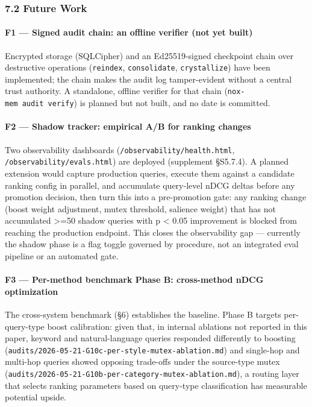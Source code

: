 \documentclass[
]{article}
\begin{document}
\subsubsection{7.2 Future Work}\label{future-work}

\paragraph{F1 --- Signed audit chain: an offline verifier (not yet
built)}\label{f1-signed-audit-chain-an-offline-verifier-not-yet-built}

Encrypted storage (SQLCipher) and an Ed25519-signed checkpoint chain
over destructive operations (\texttt{reindex}, \texttt{consolidate},
\texttt{crystallize}) have been implemented; the chain makes the audit
log tamper-evident without a central trust authority. A standalone,
offline verifier for that chain (\texttt{nox-mem\ audit\ verify}) is
planned but not built, and no date is committed.

\paragraph{F2 --- Shadow tracker: empirical A/B for ranking
changes}\label{f2-shadow-tracker-empirical-ab-for-ranking-changes}

Two observability dashboards (\texttt{/observability/health.html},
\texttt{/observability/evals.html}) are deployed (supplement §S5.7.4). A
planned extension would capture production queries, execute them against
a candidate ranking config in parallel, and accumulate query-level nDCG
deltas before any promotion decision, then turn this into a
pre-promotion gate: any ranking change (boost weight adjustment, mutex
threshold, salience weight) that has not accumulated \textgreater=50
shadow queries with p \textless{} 0.05 improvement is blocked from
reaching the production endpoint. This closes the observability gap ---
currently the shadow phase is a flag toggle governed by procedure, not
an integrated eval pipeline or an automated gate.

\paragraph{F3 --- Per-method benchmark Phase B: cross-method nDCG
optimization}\label{f3-per-method-benchmark-phase-b-cross-method-ndcg-optimization}

The cross-system benchmark (§6) establishes the baseline. Phase B
targets per-query-type boost calibration: given that, in internal
ablations not reported in this paper, keyword and natural-language
queries responded differently to boosting
(\texttt{audits/2026-05-21-G10c-per-style-mutex-ablation.md}) and
single-hop and multi-hop queries showed opposing trade-offs under the
source-type mutex
(\texttt{audits/2026-05-21-G10b-per-category-mutex-ablation.md}), a
routing layer that selects ranking parameters based on query-type
classification has measurable potential upside.
\end{document}
